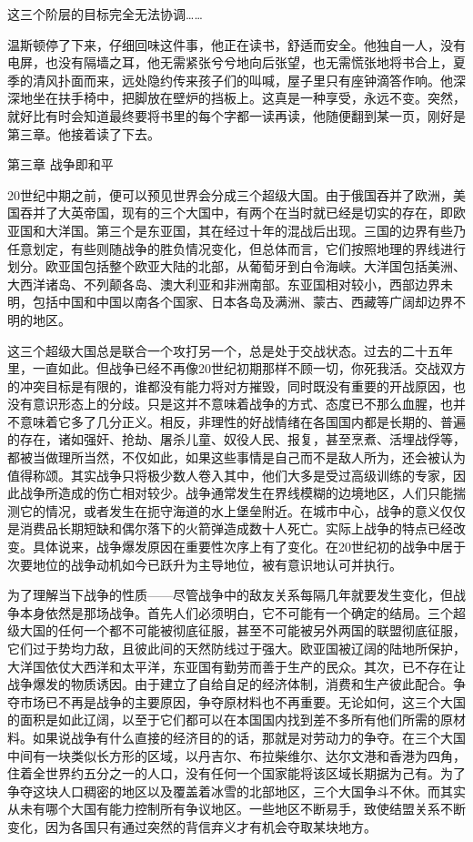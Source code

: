 这三个阶层的目标完全无法协调\ldots\ldots{}

温斯顿停了下来，仔细回味这件事，他正在读书，舒适而安全。他独自一人，没有电屏，也没有隔墙之耳，他无需紧张兮兮地向后张望，也无需慌张地将书合上，夏季的清风扑面而来，远处隐约传来孩子们的叫喊，屋子里只有座钟滴答作响。他深深地坐在扶手椅中，把脚放在壁炉的挡板上。这真是一种享受，永远不变。突然，就好比有时会知道最终要将书里的每个字都一读再读，他随便翻到某一页，刚好是第三章。他接着读了下去。

第三章 战争即和平

20世纪中期之前，便可以预见世界会分成三个超级大国。由于俄国吞并了欧洲，美国吞并了大英帝国，现有的三个大国中，有两个在当时就已经是切实的存在，即欧亚国和大洋国。第三个是东亚国，其在经过十年的混战后出现。三国的边界有些乃任意划定，有些则随战争的胜负情况变化，但总体而言，它们按照地理的界线进行划分。欧亚国包括整个欧亚大陆的北部，从葡萄牙到白令海峡。大洋国包括美洲、大西洋诸岛、不列颠各岛、澳大利亚和非洲南部。东亚国相对较小，西部边界未明，包括中国和中国以南各个国家、日本各岛及满洲、蒙古、西藏等广阔却边界不明的地区。

这三个超级大国总是联合一个攻打另一个，总是处于交战状态。过去的二十五年里，一直如此。但战争已经不再像20世纪初期那样不顾一切，你死我活。交战双方的冲突目标是有限的，谁都没有能力将对方摧毁，同时既没有重要的开战原因，也没有意识形态上的分歧。只是这并不意味着战争的方式、态度已不那么血腥，也并不意味着它多了几分正义。相反，非理性的好战情绪在各国国内都是长期的、普遍的存在，诸如强奸、抢劫、屠杀儿童、奴役人民、报复，甚至烹煮、活埋战俘等，都被当做理所当然，不仅如此，如果这些事情是自己而不是敌人所为，还会被认为值得称颂。其实战争只将极少数人卷入其中，他们大多是受过高级训练的专家，因此战争所造成的伤亡相对较少。战争通常发生在界线模糊的边境地区，人们只能揣测它的情况，或者发生在扼守海道的水上堡垒附近。在城市中心，战争的意义仅仅是消费品长期短缺和偶尔落下的火箭弹造成数十人死亡。实际上战争的特点已经改变。具体说来，战争爆发原因在重要性次序上有了变化。在20世纪初的战争中居于次要地位的战争动机如今已跃升为主导地位，被有意识地认可并执行。

为了理解当下战争的性质——尽管战争中的敌友关系每隔几年就要发生变化，但战争本身依然是那场战争。首先人们必须明白，它不可能有一个确定的结局。三个超级大国的任何一个都不可能被彻底征服，甚至不可能被另外两国的联盟彻底征服，它们过于势均力敌，且彼此间的天然防线过于强大。欧亚国被辽阔的陆地所保护，大洋国依仗大西洋和太平洋，东亚国有勤劳而善于生产的民众。其次，已不存在让战争爆发的物质诱因。由于建立了自给自足的经济体制，消费和生产彼此配合。争夺市场已不再是战争的主要原因，争夺原材料也不再重要。无论如何，这三个大国的面积是如此辽阔，以至于它们都可以在本国国内找到差不多所有他们所需的原材料。如果说战争有什么直接的经济目的的话，那就是对劳动力的争夺。在三个大国中间有一块类似长方形的区域，以丹吉尔、布拉柴维尔、达尔文港和香港为四角，住着全世界约五分之一的人口，没有任何一个国家能将该区域长期据为己有。为了争夺这块人口稠密的地区以及覆盖着冰雪的北部地区，三个大国争斗不休。而其实从未有哪个大国有能力控制所有争议地区。一些地区不断易手，致使结盟关系不断变化，因为各国只有通过突然的背信弃义才有机会夺取某块地方。

